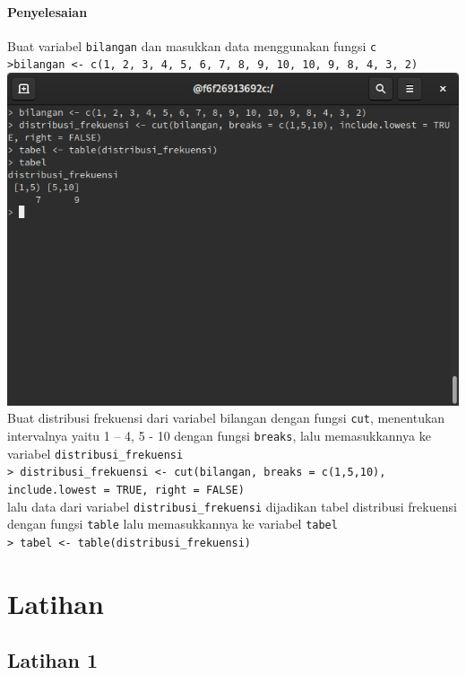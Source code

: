 \documentclass[a4paper,12pt]{article}
\begin{document}
\paragraph{Penyelesaian\\}
Buat variabel \texttt{bilangan} dan masukkan data menggunakan fungsi \texttt{c}\\
\texttt{>bilangan <- c(1, 2, 3, 4, 5, 6, 7, 8, 9, 10, 10, 9, 8, 4, 3, 2)}
\includegraphics[width=\linewidth]{4}
Buat distribusi frekuensi dari variabel bilangan dengan fungsi \texttt{cut}, menentukan intervalnya yaitu 1 – 4, 5 - 10 dengan fungsi \texttt{breaks}, lalu memasukkannya ke variabel \texttt{distribusi\_frekuensi}\\
\texttt{> distribusi\_frekuensi <- cut(bilangan, breaks = c(1,5,10), include.lowest = TRUE, right = FALSE)}\\
lalu data dari variabel \texttt{distribusi\_frekuensi} dijadikan tabel distribusi frekuensi dengan fungsi \texttt{table} lalu memasukkannya ke variabel \texttt{tabel}\\
\texttt{> tabel <- table(distribusi\_frekuensi)}
\section{Latihan}
\subsection{Latihan 1}
\end{document}
